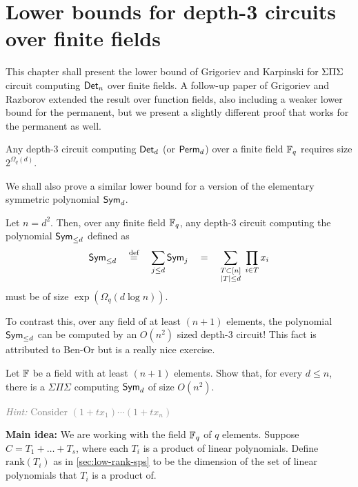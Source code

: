 \chapter{Lower bounds for depth-3 circuits over finite fields}\label{chap:GK}

This chapter shall present the lower bound of Grigoriev and Karpinski
\cite{grigoriev98} for $\Sigma\Pi\Sigma$ circuit computing $\operatorname{\mathsf{Det}}_n$ over finite
fields. 
A follow-up paper of Grigoriev and Razborov \cite{gr00}
extended the result over function fields, also including a weaker
lower bound for the permanent, but we present a slightly
different proof that works for the permanent as well.

\begin{theorem}\cite{grigoriev98}\label{thm:gk-main-thm}
  Any depth-3 circuit computing $\operatorname{\mathsf{Det}}_d$ (or $\operatorname{\mathsf{Perm}}_d$) over a finite
  field $\mathbb{F}_q$ requires size $2^{\Omega_q(d)}$.
\end{theorem}

We shall also prove a similar lower bound for a version of the elementary symmetric polynomial $\operatorname{\mathsf{Sym}}_d$. 

\begin{theorem}\label{thm:esym-finitefields}
  Let $n = d^2$. 
  Then, over any finite field $\mathbb{F}_q$, any depth-$3$ circuit computing the polynomial $\operatorname{\mathsf{Sym}}_{\leq d}$ defined as
\[
\operatorname{\mathsf{Sym}}_{\leq d} \quad \stackrel{\text{def}}{=} \quad \sum_{j\leq d} \operatorname{\mathsf{Sym}}_j \quad = \quad \sum_{\substack{T \subset [n]\\ |T| \leq d}} \; \prod_{i\in T} x_i
\]
must be of size $\exp(\Omega_q(d \log n))$. 
\end{theorem}

To contrast this, over any field of at least $(n+1)$ elements, the polynomial $\operatorname{\mathsf{Sym}}_{\leq d}$ can be computed by an $O(n^2)$ sized depth-$3$ circuit! This fact is attributed to Ben-Or but is a really nice exercise. 

\begin{exercise} 
Let $\mathbb{F}$ be a field with at least $(n+1)$ elements. 
Show that, for every $d \leq n$, there is a $\Sigma\Pi\Sigma$ 
computing  $\operatorname{\mathsf{Sym}}_{d}$ of size $O(n^2)$. 

\noindent
\textcolor{gray}{\emph{Hint: } Consider $(1+tx_1) \cdots (1+tx_n)$}
\end{exercise}



{\bf Main idea:} We are working with the field $\mathbb{F}_q$ of $q$ elements. 
Suppose $C = T_1 + \dots + T_s$,
where each $T_i$ is a product of linear polynomials. 
Define
$\mathrm{rank}(T_i)$ as in \autoref{sec:low-rank-sps} to be the
dimension of the set of linear polynomials that $T_i$ is a product of.

